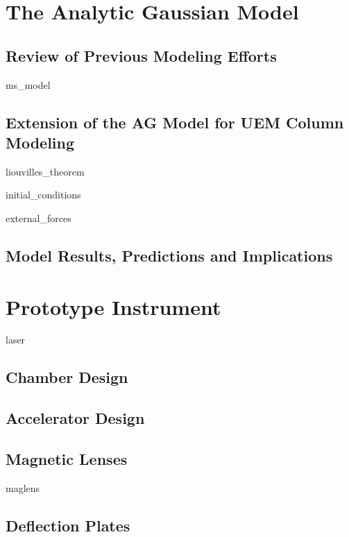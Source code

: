 \documentclass{uicthesi}
\begin{document}
\chapter{The Analytic Gaussian Model}

\section{Review of Previous Modeling Efforts}

  {ms_model}

\section{Extension of the AG Model for UEM Column Modeling}

  {liouvilles_theorem}

  {initial_conditions}

  {external_forces}

\section{Model Results, Predictions and Implications} \label{sec:model_results}

\chapter{Prototype Instrument}

  {laser}

\section{Chamber Design}

\section{Accelerator Design}

\section{Magnetic Lenses}

  {maglens}

\section{Deflection Plates}
\end{document}
